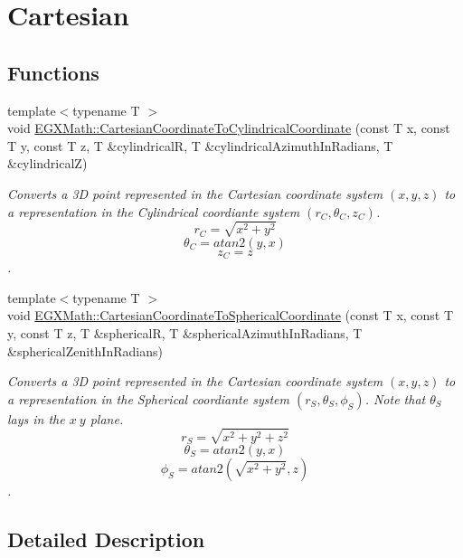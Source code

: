 \hypertarget{group___e_g_x_math-_conversions-_coordinate_conversions-3_d-_cartesian}{}\section{Cartesian}
\label{group___e_g_x_math-_conversions-_coordinate_conversions-3_d-_cartesian}
\subsection*{Functions}
\begin{DoxyCompactItemize}
\item 
{\footnotesize template$<$typename T $>$ }\\void \mbox{\hyperlink{group___e_g_x_math-_conversions-_coordinate_conversions-3_d-_cartesian_ga50f1cbdafbe435b13e34c7a3a6ccedc6}{E\+G\+X\+Math\+::\+Cartesian\+Coordinate\+To\+Cylindrical\+Coordinate}} (const T x, const T y, const T z, T \&cylindricalR, T \&cylindrical\+Azimuth\+In\+Radians, T \&cylindricalZ)
\begin{DoxyCompactList}\small\item\em Converts a 3D point represented in the Cartesian coordinate system $(x,y,z)$ to a representation in the Cylindrical coordiante system $(r_C,\theta_C,z_C)$. \[ r_C = \sqrt{x^2+y^2} \] \[ \theta_C = atan2(y,x) \] \[ z_C = z \]. \end{DoxyCompactList}\item 
{\footnotesize template$<$typename T $>$ }\\void \mbox{\hyperlink{group___e_g_x_math-_conversions-_coordinate_conversions-3_d-_cartesian_ga159ac2cb3f9e133e0af002f58b425476}{E\+G\+X\+Math\+::\+Cartesian\+Coordinate\+To\+Spherical\+Coordinate}} (const T x, const T y, const T z, T \&sphericalR, T \&spherical\+Azimuth\+In\+Radians, T \&spherical\+Zenith\+In\+Radians)
\begin{DoxyCompactList}\small\item\em Converts a 3D point represented in the Cartesian coordinate system $(x,y,z)$ to a representation in the Spherical coordiante system $(r_S,\theta_S,\phi_S)$. Note that $\theta_S$ lays in the $x\ y$ plane. \[ r_S = \sqrt{x^2+y^2+z^2} \] \[ \theta_S = atan2(y,x) \] \[ \phi_S = atan2(\sqrt{x^2+y^2},z) \]. \end{DoxyCompactList}\end{DoxyCompactItemize}


\subsection{Detailed Description}



